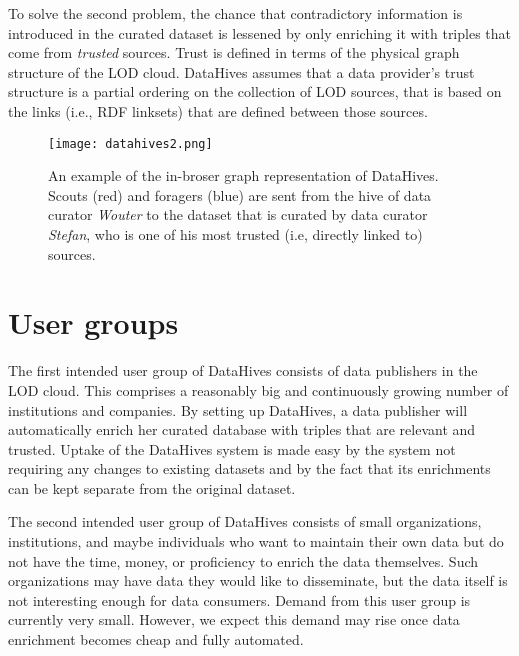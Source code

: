 \documentclass{article}
\begin{document}
To solve the second problem, the chance that contradictory information
  is introduced in the curated dataset is lessened by
  only enriching it with triples that come from \emph{trusted} sources.
Trust is defined in terms of the physical graph structure of the LOD cloud.
DataHives assumes that a data provider's trust structure is a partial
  ordering on the collection of LOD sources, that is based on the links
  (i.e., RDF linksets) that are defined between those sources.

\begin{figure}[ht]
  \centering
  \caption{
An example of the in-broser graph representation of DataHives.
Scouts (red) and foragers (blue) are sent from the hive of
data curator \emph{Wouter} to the dataset that is curated by
data curator \emph{Stefan}, who is one of his most trusted
(i.e, directly linked to) sources.
  }
  \texttt{[image: datahives2.png]} \label{fig:datahives}
\end{figure}


\section{User groups}

The first intended user group of DataHives consists of data publishers
in the LOD cloud.
This comprises a reasonably big and continuously growing number of
institutions and companies.
By setting up DataHives, a data publisher will automatically enrich
her curated database with triples that are relevant and trusted.
Uptake of the DataHives system is made easy by the system not requiring
any changes to existing datasets and by the fact that its enrichments
can be kept separate from the original dataset.

The second intended user group of DataHives consists of small
organizations, institutions, and maybe individuals who want to maintain
their own data but do not have the time, money, or proficiency to
enrich the data themselves.
Such organizations may have data they would like to disseminate,
but the data itself is not interesting enough for data consumers.
Demand from this user group is currently very small.
However, we expect this demand may rise once data enrichment becomes
cheap and fully automated.
\end{document}
